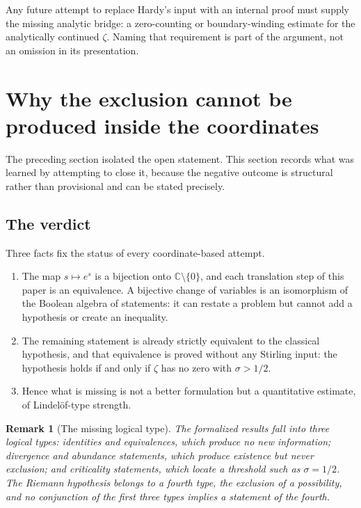\documentclass[submission,noinfoline]{jsfds}
\newtheorem*{remark}{Remark}
\newcommand{\Lean}[1]{}
\begin{document}
Any future attempt to replace Hardy's input with an internal proof must supply
the missing analytic bridge: a zero-counting or boundary-winding estimate for
the analytically continued $\zeta$. Naming that requirement is part of the
argument, not an omission in its presentation.

\section{Why the exclusion cannot be produced inside the coordinates}
\label{sec:negative}

The preceding section isolated the open statement. This section records what
was learned by attempting to close it, because the negative outcome is
structural rather than provisional and can be stated precisely.

\subsection{The verdict}

Three facts fix the status of every coordinate-based attempt.

\begin{enumerate}
\item The map $s\mapsto e^{s}$ is a bijection onto $\mathbb C\setminus\{0\}$,
and each translation step of this paper is an equivalence. A bijective change
of variables is an isomorphism of the Boolean algebra of statements: it can
restate a problem but cannot add a hypothesis or create an inequality.
\Lean{zetaCoverIsomorphism}
\item The remaining statement is already strictly equivalent to the classical
hypothesis, and that equivalence is proved without any Stirling input:
the hypothesis holds if and only if $\zeta$ has no zero with
$\sigma>1/2$. \Lean{riemannHypothesis_iff_zeroFreeHalfPlane}
\item Hence what is missing is not a better formulation but a quantitative
estimate, of Lindel\"of-type strength.
\end{enumerate}

\begin{remark}[The missing logical type]\label{rem:type}
The formalized results fall into three logical types: identities and
equivalences, which produce no new information; divergence and abundance
statements, which produce existence but never exclusion; and criticality
statements, which locate a threshold such as $\sigma=1/2$. The Riemann
hypothesis belongs to a fourth type, the exclusion of a possibility, and no
conjunction of the first three types implies a statement of the fourth.
\end{remark}
\end{document}

